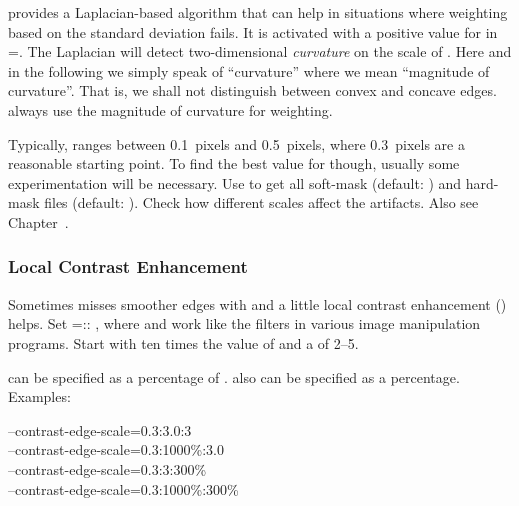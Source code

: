 \App{} provides a Laplacian-based algorithm that can help in situations where weighting based on
the standard deviation fails.  It is activated with a positive value for  in
=.  The Laplacian will detect two-dimensional
\emph{curvature} on the scale of .  Here and in the following we simply speak of
``curvature'' where we mean ``magnitude of curvature''.  That is, we shall not distinguish
between convex and concave edges.  \App{} always use the magnitude of curvature for weighting.

Typically,  ranges between 0.1~pixels and 0.5~pixels, where 0.3~pixels are a
reasonable starting point.  To find the best value for  though, usually some
experimentation will be necessary.  Use  to get all soft-mask (default:
\mbox{}) and hard-mask files (default:
\mbox{}).  Check how different scales affect the
artifacts.  Also see Chapter~.


\subsubsection[Local Contrast Enhancement]{\label{sec:local-contrast-enhancement}%
  Local Contrast Enhancement}

Sometimes \App{} misses smoother edges with  and a little local
contrast enhancement () helps.  Set =\feasiblebreak {}:\feasiblebreak {}:\feasiblebreak
{}, where  and  work like
the  filters in various image manipulation
programs.  Start with  ten times the value of  and a
 of 2--5.

 can be specified as a percentage of .   also can be specified as a percentage.  Examples:

\begin{literal}
--contrast-edge-scale=0.3:3.0:3 \\
--contrast-edge-scale=0.3:1000\%:3.0 \\
--contrast-edge-scale=0.3:3:300\% \\
--contrast-edge-scale=0.3:1000\%:300\%
\end{literal}


